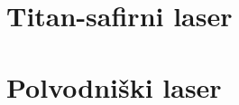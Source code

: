 \documentclass[11pt,fleqn]{book} %
\begin{document}
\section{Titan-safirni laser}
\section{Polvodniški laser}














\printindex
\end{document}
